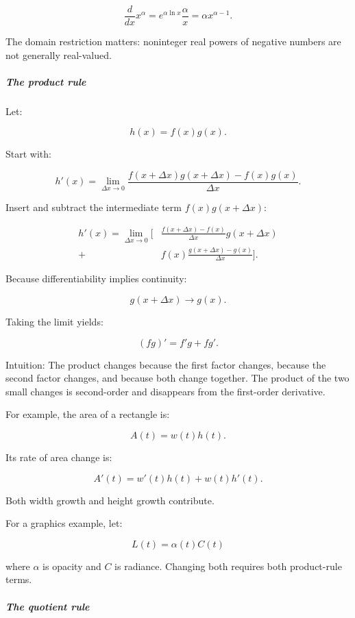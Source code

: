 \[
\frac d{dx}x^\alpha =e^{\alpha\ln x}\frac{\alpha}{x} =\alpha x^{\alpha-1}.
\]

The domain restriction matters: noninteger real powers of negative numbers are not generally real-valued.

\subparagraph{The product rule}\label{01-foundations-i-ch020-the-product-rule}

\hypertarget{01-foundations-i-ch020-the-product-rule}{}

Let:

\[
h(x)=f(x)g(x).
\]

Start with:

\[
h'(x)= \lim_{\Delta x\to0} \frac{f(x+\Delta x)g(x+\Delta x)-f(x)g(x)}{\Delta x}.
\]

Insert and subtract the intermediate term \(f(x)g(x+\Delta x)\):

\[
\begin{aligned} h'(x)=\lim_{\Delta x\to0} \bigg[ &\frac{f(x+\Delta x)-f(x)}{\Delta x}g(x+\Delta x)\\ +{}&f(x)\frac{g(x+\Delta x)-g(x)}{\Delta x} \bigg]. \end{aligned}
\]

Because differentiability implies continuity:

\[
g(x+\Delta x)\to g(x).
\]

Taking the limit yields:

\[
\boxed{(fg)'=f'g+fg'}.
\]

Intuition: The product changes because the first factor changes, because the second factor changes, and because both change together. The product of the two small changes is second-order and disappears from the first-order derivative.

For example, the area of a rectangle is:

\[
A(t)=w(t)h(t).
\]

Its rate of area change is:

\[
A'(t)=w'(t)h(t)+w(t)h'(t).
\]

Both width growth and height growth contribute.

For a graphics example, let:

\[
L(t)=\alpha(t)C(t)
\]

where \(\alpha\) is opacity and \(C\) is radiance. Changing both requires both product-rule terms.

\subparagraph{The quotient rule}\label{01-foundations-i-ch020-the-quotient-rule}

\hypertarget{01-foundations-i-ch020-the-quotient-rule}{}

